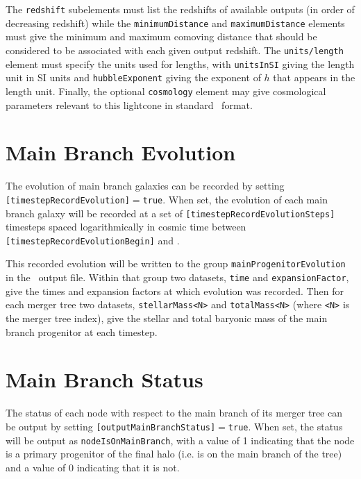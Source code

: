  The {\tt redshift} subelements must list the redshifts of available outputs (in order of decreasing redshift) while the {\tt minimumDistance} and {\tt maximumDistance} elements must give the minimum and maximum comoving distance that should be considered to be associated with each given output redshift. The {\tt units/length} element must specify the units used for lengths, with {\tt unitsInSI} giving the length unit in SI units and {\tt hubbleExponent} giving the exponent of $h$ that appears in the length unit. Finally, the optional {\tt cosmology} element may give cosmological parameters relevant to this lightcone in standard \glc\ format.

\section{Main Branch Evolution}

The evolution of main branch galaxies can be recorded by setting {\tt [timestepRecordEvolution]}$=${\tt true}. When set, the evolution of each main branch galaxy will be recorded at a set of {\tt [timestepRecordEvolutionSteps]} timesteps spaced logarithmically in cosmic time between {\tt [timestepRecordEvolutionBegin]} and \newline {\tt [timestepRecordEvolutionEnd]}. 

This recorded evolution will be written to the group {\tt mainProgenitorEvolution} in the \glc\ output file. Within that group two datasets, {\tt time} and {\tt expansionFactor}, give the times and expansion factors at which evolution was recorded. Then for each merger tree two datasets, {\tt stellarMass<N>} and {\tt totalMass<N>} (where {\tt <N>} is the merger tree index), give the stellar and total baryonic mass of the main branch progenitor at each timestep.

\section{Main Branch Status}

The status of each node with respect to the main branch of its merger tree can be output by setting {\tt [outputMainBranchStatus]}$=${\tt true}. When set, the status will be output as {\tt nodeIsOnMainBranch}, with a value of 1 indicating that the node is a primary progenitor of the final halo (i.e. is on the main branch of the tree) and a value of 0 indicating that it is not.


